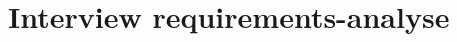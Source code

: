 \documentclass[dutch,dit,thesis]{hogentreport}
\begin{document}
    
    
    
    \chapter{Interview requirements-analyse}
    \label{ch:interview-requirementsanalyse}
    
    
    
    
    \backmatter{}
    
    \setlength\bibitemsep{2pt} %
    \printbibliography[heading=bibintoc]
    
\end{document}
